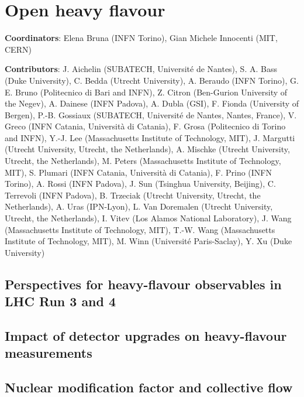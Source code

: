 \documentclass[../report.tex]{subfiles}
\providecommand{\main}{..}
\begin{document}
\clearpage
\section{Open heavy flavour}
\label{sec:HI_HF}

\begin{flushleft}
\textbf{Coordinators}: Elena Bruna (INFN Torino), Gian Michele Innocenti (MIT, CERN)
\end{flushleft}
\textbf{Contributors}: 
J. Aichelin (SUBATECH, Universit\'e de Nantes),
S. A. Bass (Duke University),
C. Bedda (Utrecht University),
A. Beraudo (INFN Torino),
G. E. Bruno (Politecnico di Bari and INFN), 
Z. Citron (Ben-Gurion University of the Negev),
A. Dainese (INFN Padova),
A. Dubla (GSI),
F. Fionda (University of Bergen),
P.-B. Gossiaux (SUBATECH, Universit\'e de Nantes, Nantes, France),
V. Greco (INFN Catania, Universit\`a di Catania),
F. Grosa (Politecnico di Torino and INFN),
Y.-J. Lee (Massachusetts Institute of Technology, MIT),
J. Margutti (Utrecht University, Utrecht, the Netherlands),
A. Mischke (Utrecht University, Utrecht, the Netherlands),
M. Peters (Massachusetts Institute of Technology, MIT),
S. Plumari (INFN Catania, Universit\`a di Catania),
F. Prino (INFN Torino),
A. Rossi (INFN Padova),
J. Sun (Tsinghua University, Beijing),
C. Terrevoli (INFN Padova),
B. Trzeciak (Utrecht University, Utrecht, the Netherlands),
A. Uras (IPN-Lyon),
L. Van Doremalen (Utrecht University, Utrecht, the Netherlands),
I. Vitev (Los Alamos National Laboratory),
J. Wang (Massachusetts Institute of Technology, MIT),
T.-W. Wang (Massachusetts Institute of Technology, MIT),
M. Winn (Universit\'e Paris-Saclay),
Y. Xu (Duke University)



\subsection{Perspectives for heavy-flavour observables in LHC Run 3 and 4}


\subsection{Impact of detector upgrades on heavy-flavour measurements}


\subsection{Nuclear modification factor and collective flow}

\end{document}
